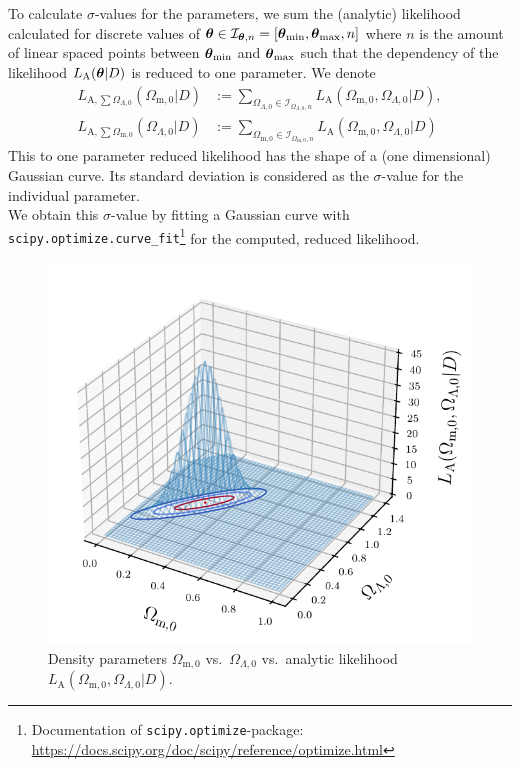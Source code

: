 \noindent To calculate $\sigma$-values for the  parameters, we sum the (analytic) likelihood calculated for discrete values of $\vb*{\theta} \in \mathcal{I}_{\vb*{\theta}, n} = [\vb*{\theta}_{\text{min}}, \vb*{\theta}_{\text{max}}, n]$ where $n$ is the amount of linear spaced points between $\vb*{\theta}_{\text{min}}$ and $\vb*{\theta}_{\text{max}}$ such that the dependency of the likelihood $L_{\text{A}} (\vb*{\theta} \vert D)$ is reduced to one parameter. We denote
\begin{align}
    L_{\text{A}, \sum \Omega_{\Lambda,0}}(\Omega_{\text{m}, 0} \vert D) &:= \sum_{\Omega_{\Lambda, 0} \in \mathcal{I}_{\Omega_{\Lambda,0}, n}} L_{\text{A}}(\Omega_{\text{m}, 0}, \Omega_{\Lambda,0} \vert D), \\
    L_{\text{A}, \sum \Omega_{\text{m},0}} (\Omega_{\Lambda, 0} \vert D) &:= \sum_{\Omega_{\text{m}, 0} \in \mathcal{I}_{\Omega_{\text{m},0}, n}} L_{\text{A}}(\Omega_{\text{m}, 0}, \Omega_{\Lambda,0} \vert D)
\end{align}
This to one parameter reduced likelihood has the shape of a (one dimensional) Gaussian curve. Its standard deviation is considered as the $\sigma$-value for the individual parameter. \\
We obtain this $\sigma$-value by fitting a Gaussian curve with \colorbox{backcolor}{\lstinline{scipy.optimize.curve_fit}}\footnote{Documentation of \colorbox{backcolor}{\lstinline{scipy.optimize}}-package: \href{https://docs.scipy.org/doc/scipy/reference/optimize.html}{https://docs.scipy.org/doc/scipy/reference/optimize.html}} for the computed, reduced likelihood.

\begin{figure}[H]
    \centering
    \includegraphics[scale=0.72]{figures/plots/PDF/Lambda-CDM-analytic-likelihood_Omega-m0-vs-Omega-Lambda0-vs-likelihood.pdf}
    \caption{Density parameters $\Omega_{\text{m},0}$ vs.\ $\Omega_{\Lambda,0}$ vs.\ analytic likelihood $L_{\text{A}}(\Omega_{\text{m},0}, \Omega_{\Lambda,0} \vert D)$.}
    \label{fig:Lambda-CDM-analytic-likelihood_Omega-m0-vs-Omega-Lambda0-vs-likelihood}
\end{figure}


